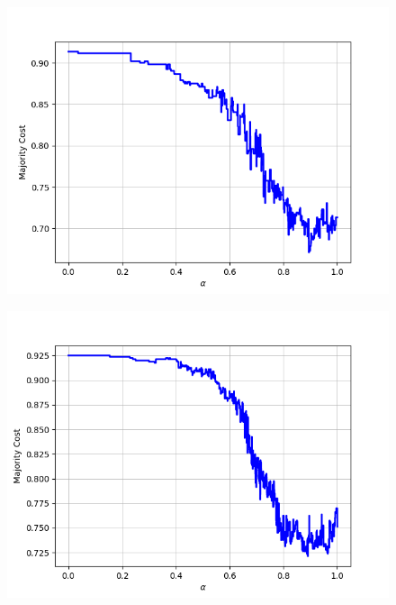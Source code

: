 \begin{figure}[H]\ContinuedFloat
\centering
\begin{minipage}{.24\textwidth}
  \centering
  {\includegraphics[width=\linewidth]{plots/omniglot-intra-sc/Korean}}
\end{minipage}
\begin{minipage}{.24\textwidth}
  \centering
  {\includegraphics[width=\linewidth]{plots/omniglot-intra-sc/Latin}}
\end{minipage}
\begin{minipage}{.24\textwidth}
  \centering

\end{minipage}
\end{figure}
